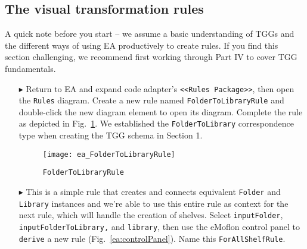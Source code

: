 \newpage
\hypertarget{treeToModel vis}{}
\subsection{The visual transformation rules}
\visHeader

A quick note before you start -- we assume a basic understanding of TGGs and the different ways of using EA productively to create rules. If you find this
section challenging, we recommend first working through Part IV to cover TGG fundamentals.

\begin{itemize}

\subsubsection{FolderToLibraryRule} %

\item[$\blacktriangleright$] Return to EA and expand code adapter's \texttt{<<Rules Package>>}, then open the \texttt{Rules} diagram. Create a new rule
named \texttt{FolderToLibraryRule} and double-click the new diagram element to open its diagram. Complete the rule as depicted in
Fig.~\ref{ea:FolderIntoLibrary_Complete}. We established the \texttt{FolderToLibrary} correspondence type when creating the TGG schema in Section 1.

\vspace{0.5cm}

\begin{figure}[htbp]
\begin{center}
  \texttt{[image: ea\_FolderToLibraryRule]}
  \caption{\texttt{FolderToLibraryRule}}
  \label{ea:FolderIntoLibrary_Complete}
\end{center}
\end{figure}

\item[$\blacktriangleright$] This is a simple rule that creates and connects equivalent \texttt{Folder} and \texttt{Library} instances and we're able to use
this entire rule as context for the next rule, which will handle the creation of shelves. Select \texttt{inputFolder},
\texttt{in\-put\-Fol\-der\-To\-Lib\-rary,} and \texttt{library}, then use the eMoflon control panel to \texttt{derive} a new rule (Fig.~\ref{ea:controlPanel}).
Name this \texttt{ForAllShelfRule}.

\vspace{0.5cm}


\end{itemize}
